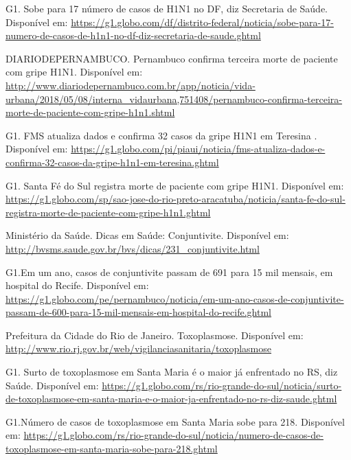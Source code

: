 \documentclass{article}
\begin{document}
\begin{enumerate}
{	\item G1. Sobe para 17 número de casos de H1N1 no DF, diz Secretaria de Saúde. Disponível em: \url{https://g1.globo.com/df/distrito-federal/noticia/sobe-para-17-numero-de-casos-de-h1n1-no-df-diz-secretaria-de-saude.ghtml} 

	\item DIARIODEPERNAMBUCO. Pernambuco confirma terceira morte de paciente com gripe H1N1. Disponível em: \url{http://www.diariodepernambuco.com.br/app/noticia/vida-urbana/2018/05/08/interna_vidaurbana,751408/pernambuco-confirma-terceira-morte-de-paciente-com-gripe-h1n1.shtml}
   
	\item G1. FMS atualiza dados e confirma 32 casos da gripe H1N1 em Teresina . Disponível em: \url{https://g1.globo.com/pi/piaui/noticia/fms-atualiza-dados-e-confirma-32-casos-da-gripe-h1n1-em-teresina.ghtml}
 
	\item G1. Santa Fé do Sul registra morte de paciente com gripe H1N1. Disponível em: \url{https://g1.globo.com/sp/sao-jose-do-rio-preto-aracatuba/noticia/santa-fe-do-sul-registra-morte-de-paciente-com-gripe-h1n1.ghtml}
   
	\item Ministério da Saúde. Dicas em Saúde: Conjuntivite. Disponível em: \url{http://bvsms.saude.gov.br/bvs/dicas/231_conjuntivite.html}
 
	\item G1.Em um ano, casos de conjuntivite passam de 691 para 15 mil mensais, em hospital do Recife. Disponível em: \url{https://g1.globo.com/pe/pernambuco/noticia/em-um-ano-casos-de-conjuntivite-passam-de-600-para-15-mil-mensais-em-hospital-do-recife.ghtml}
 
	\item Prefeitura da Cidade do Rio de Janeiro. Toxoplasmose. Disponível em: \url{http://www.rio.rj.gov.br/web/vigilanciasanitaria/toxoplasmose}
   
	\item G1. Surto de toxoplasmose em Santa Maria é o maior já enfrentado no RS, diz Saúde. Disponível em: \url{https://g1.globo.com/rs/rio-grande-do-sul/noticia/surto-de-toxoplasmose-em-santa-maria-e-o-maior-ja-enfrentado-no-rs-diz-saude.ghtml}

	\item G1.Número de casos de toxoplasmose em Santa Maria sobe para 218. Disponível em: \url{https://g1.globo.com/rs/rio-grande-do-sul/noticia/numero-de-casos-de-toxoplasmose-em-santa-maria-sobe-para-218.ghtml}

}
\end{enumerate}
\end{document}
